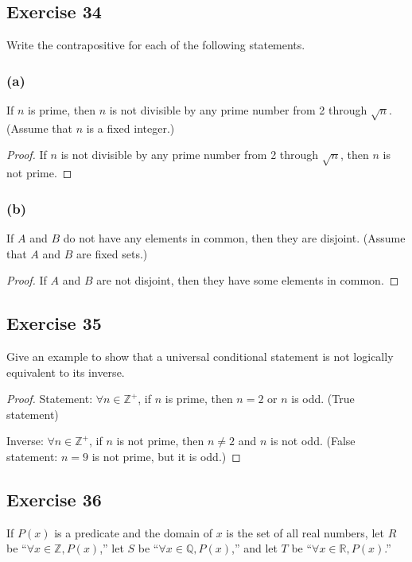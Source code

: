 \documentclass[14pt]{extarticle}
\newcommand{\R}{\mathbb{R}}
\newcommand{\Z}{\mathbb{Z}}
\newcommand{\Q}{\mathbb{Q}}
\newcommand{\fa}{\forall}
\begin{document}
\subsection{Exercise 34}
Write the contrapositive for each of the following statements.

\subsubsection{(a)}
If $n$ is prime, then $n$ is not divisible by any prime number from 2 through $\sqrt{n}$. (Assume that $n$ is a fixed integer.)

\begin{proof}
    If $n$ is not divisible by any prime number from 2 through $\sqrt{n}$, then $n$ is not prime.
\end{proof}

\subsubsection{(b)}
If $A$ and $B$ do not have any elements in common, then they are disjoint. (Assume that $A$ and $B$ are fixed sets.)

\begin{proof}
    If $A$ and $B$ are not disjoint, then they have some elements in common.
\end{proof}

\subsection{Exercise 35}
Give an example to show that a universal conditional statement is not logically equivalent to its inverse.

\begin{proof}
    Statement: $\fa n \in \Z^+$, if $n$ is prime, then $n = 2$ or $n$ is odd. (True statement)

    Inverse: $\fa n \in \Z^+$, if $n$ is not prime, then $n \neq 2$ and $n$ is not odd. (False statement: $n = 9$ is not prime, but it is odd.)
\end{proof}

\subsection{Exercise 36}
If $P(x)$ is a predicate and the domain of $x$ is the set of all real numbers, let $R$ be “$\fa x \in \Z, P(x)$,” let $S$ be “$\fa x \in \Q, P(x)$,” and let $T$ be “$\fa x \in \R, P(x)$.”
\end{document}
